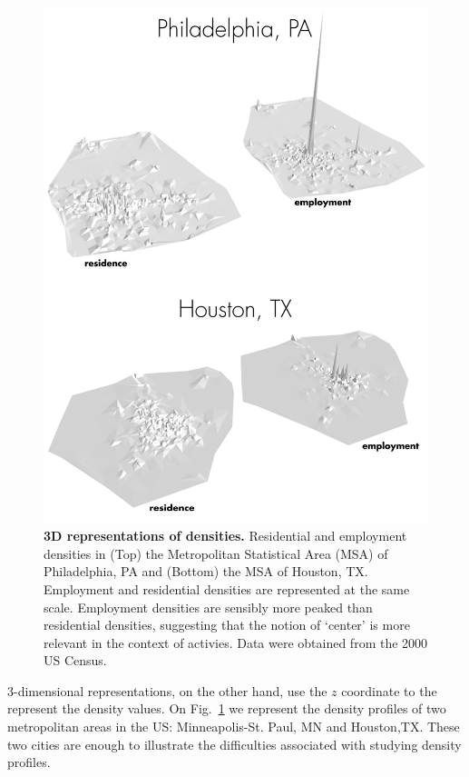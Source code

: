 \begin{figure}
    \centering
    \includegraphics[width=\textwidth]{gfx/chapter-monocentric/panel_3d.png}
    \caption{{\bf 3D representations of densities.} Residential and
        employment densities in (Top) the Metropolitan Statistical Area (MSA) of
        Philadelphia, PA and (Bottom) the MSA of Houston, TX. Employment and
        residential densities are represented at the same scale.  Employment
        densities are sensibly more peaked than residential densities,
        suggesting that the notion of `center' is more relevant in the context of
        activies. Data were obtained from the 2000 US Census.  \label{fig:density_3d}}
\end{figure}


3-dimensional representations, on the other hand, use the $z$ coordinate to the
represent the density values. On Fig.~\ref{fig:density_3d} we represent the
density profiles of two metropolitan areas in the US: Minneapolis-St.  Paul, MN
and Houston,TX. These two cities are enough to illustrate the difficulties
associated with studying density profiles.

